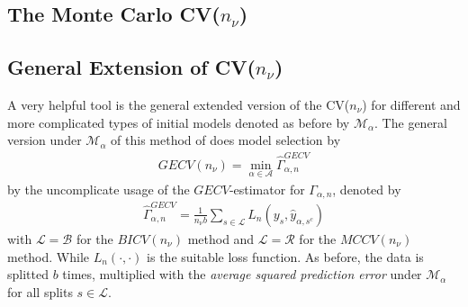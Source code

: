 \documentclass[Research_Module_ES.tex]{subfiles}
\begin{document}
	



\subsection{The Monte Carlo CV($n_\nu$)}



\subsection{General Extension of CV($n_\nu$)}
A very helpful tool is the general extended version of the CV($n_\nu$) for different and more complicated types of initial models denoted as before by $\mathcal{M}_\alpha$. The general version under $\mathcal{M}_\alpha$ of this method of \cite{shao} does model selection by 
\begin{align*}
	GECV(n_\nu)=\min_{\alpha\in\mathcal{A}}\hat{\Gamma}_{\alpha,n}^{GECV}
\end{align*}
by the uncomplicate usage of the $GECV$-estimator for $\Gamma_{\alpha,n}$, denoted by
\begin{align*}
	\hat{\Gamma}_{\alpha,n}^{GECV}=\frac{1}{n_\nu b}\sum_{s\in\mathcal{L}}L_n(y_s,\hat{y}_{\alpha,s^c})
\end{align*} 
with $\mathcal{L}=\mathcal{B}$ for the $BICV(n_\nu)$ method and $\mathcal{L}=\mathcal{R}$ for the $MCCV(n_\nu)$ method. While $L_n(\cdot,\cdot)$ is the suitable loss function. As before, the data is splitted $b$ times, multiplied with the \textit{average squared prediction error} under $\mathcal{M}_\alpha$ for all splits $s\in\mathcal{L}$.
\end{document}
